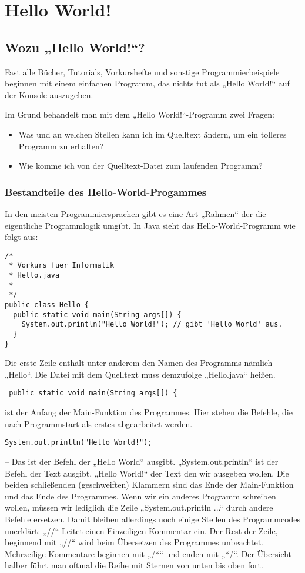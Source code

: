 \chapter {Hello World!}
\lstset{language=Java}

\section {Wozu „Hello World!“?}

Fast alle Bücher, Tutorials, Vorkurshefte und sonstige Programmierbeispiele beginnen mit einem einfachen Programm, das nichts tut als „Hello World!“ auf der Konsole auszugeben.

Im Grund behandelt man mit dem „Hello World!“-Programm zwei Fragen:
\begin{itemize}
\item Was und an welchen Stellen kann ich im Quelltext ändern, um ein tolleres Programm zu erhalten?
\item Wie komme ich von der Quelltext-Datei zum laufenden Programm?
\end{itemize}

\subsection{Bestandteile des Hello-World-Progammes}
In den meisten Programmiersprachen gibt es eine Art „Rahmen“ der die eigentliche Programmlogik umgibt.
In Java sieht das Hello-World-Programm wie folgt aus: 
\begin{lstlisting}
/*
 * Vorkurs fuer Informatik
 * Hello.java
 *
 */
public class Hello {
  public static void main(String args[]) {
    System.out.println("Hello World!");	// gibt 'Hello World' aus.
  }
}
\end{lstlisting}

Die erste Zeile enthält unter anderem den Namen des Programms nämlich „Hello“. Die Datei mit dem Quelltext muss demzufolge „Hello.java“ heißen.
\begin{verbatim} public static void main(String args[]) {\end{verbatim} ist der Anfang der Main-Funktion des Programmes. Hier stehen die Befehle, die nach Programmstart als erstes abgearbeitet werden.
\begin{verbatim}System.out.println("Hello World!");\end{verbatim} – Das ist der Befehl der „Hello World“ ausgibt. „System.out.println“ ist der Befehl der Text ausgibt, „Hello World!“ der Text den wir ausgeben wollen. 
Die beiden schließenden (geschweiften) Klammern sind das Ende der Main-Funktion und das Ende des Programmes. 
Wenn wir ein anderes Programm schreiben wollen, müssen wir lediglich die Zeile „System.out.println ...“ durch andere Befehle ersetzen.
Damit bleiben allerdings noch einige Stellen des Programmcodes unerklärt: „//“ Leitet einen Einzeiligen Kommentar ein. Der Rest der Zeile, beginnend mit „//“ wird beim Übersetzen des Programmes unbeachtet.
Mehrzeilige Kommentare beginnen mit „/*“ und enden mit „*/“. Der Übersicht halber führt man oftmal die Reihe mit Sternen von unten bis oben fort.


